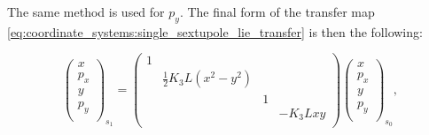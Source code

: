 The same method is used for $p_y$.
The final form of the transfer map \cref{eq:coordinate_systems:single_sextupole_lie_transfer} is
then the following:

\begin{equation}
    \begin{pmatrix}
        x \\
        p_x \\
        y \\
        p_y \\
    \end{pmatrix}_{s_1}
    =
    \begin{pmatrix}
        1 &  &  &  \\
         & \frac{1}{2}K_3L(x^2-y^2) &  & \\
         & & 1 & \\
         & &  & -K_3Lxy\\ 
    \end{pmatrix}
    \begin{pmatrix}
        x \\
        p_x \\
        y \\
        p_y \\
    \end{pmatrix}_{s_0},
\end{equation}

